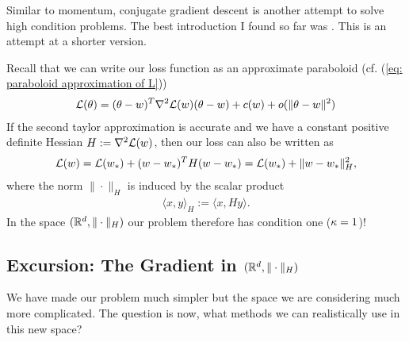 Similar to momentum, conjugate gradient descent is another attempt to solve
high condition problems. The best introduction I found so far was
\textcite{shewchukIntroductionConjugateGradient1994}. This is an attempt at a
shorter version. 

Recall that we can write
our loss function as an approximate paraboloid (cf. (\ref{eq: paraboloid
approximation of L}))
\begin{align*}
	\mathcal{L}(\theta)
	= (\theta-w)^T \nabla^2\mathcal{L}(w)(\theta-w)
	+ c(w) + o(\|\theta-w\|^2)
\end{align*}
If the second taylor approximation is accurate and we have a constant
positive definite Hessian \(H:=\nabla^2\mathcal{L}(w)\), then our loss can also
be written as
\begin{align*}
	\mathcal{L}(w) = \mathcal{L}(w_*) + 
	(w-w_*)^T H(w-w_*)
	= \mathcal{L}(w_*) + \|w-w_*\|_H^2,
\end{align*}
where the norm \(\|\cdot\|_H\) is induced by the scalar product
\begin{align*}
	\langle x, y \rangle_H := \langle x, Hy\rangle.
\end{align*}
In the space \((\mathbb{R}^d, \|\cdot\|_H)\) our problem therefore has condition one
(\(\kappa=1\))!

\subsection{Excursion: The Gradient in \((\mathbb{R}^d, \|\cdot\|_H)\)}

We have made our problem much simpler but the space we are considering much
more complicated. The question is now, what methods we can realistically use
in this new space?


